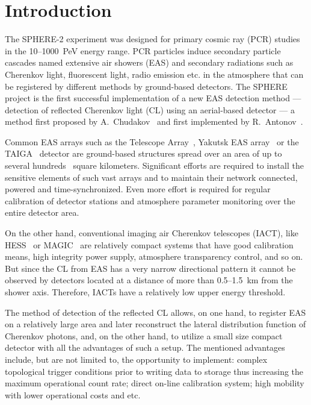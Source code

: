 \documentclass[preprint,5p,times]{elsarticle}
\begin{document}
\section{Introduction}
The SPHERE-2 experiment was designed for primary cosmic ray (PCR) studies in the 10--1000~PeV energy range. PCR particles induce secondary particle cascades named extensive air showers (EAS) and secondary radiations such as Cherenkov light, fluorescent light, radio emission etc. in the atmosphere that can be registered by different methods by ground-based detectors. 
The SPHERE project is the first successful implementation of a new EAS detection method --- detection of reflected Cherenkov light (CL) using an aerial-based detector --- a method first proposed by A.~Chudakov~\cite{chu74:VKKL74} and first implemented by R.~Antonov~\cite{ant75, ant86, ant97, Ant15a}.

Common EAS arrays such as the Telescope Array~\cite{abu12}, Yakutsk EAS array~\cite{Yakutsk19} or the TAIGA~\cite{TAIGA20} detector are ground-based structures spread over an area of up to several hundreds~\cite{abu12} square kilometers. Significant efforts are required to install the sensitive elements of such vast arrays and to maintain their network connected, powered and time-synchronized. Even more effort is required for regular calibration of detector stations and atmosphere parameter monitoring over the entire detector area. 

On the other hand, conventional imaging air Cherenkov telescopes (IACT), like HESS~\cite{HESS03a, HESS03b} or MAGIC~\cite{MAGIC16-1, MAGIC16-2} are relatively compact systems that have good calibration means, high integrity power supply, atmosphere transparency control, and so on. But since the CL from EAS has a very narrow directional pattern it cannot be observed by detectors located at a distance of more than 0.5--1.5~km from the shower axis. Therefore, IACTs have a relatively low upper energy threshold.

The method of detection of the reflected CL allows, on one hand, to register EAS on a relatively large area and later reconstruct the lateral distribution function of Cherenkov photons, and, on the other hand, to utilize a small size compact detector with all the advantages of such a setup. The mentioned advantages include, but are not limited to, the opportunity to implement: complex topological trigger conditions prior to writing data to storage thus increasing the maximum operational count rate; direct on-line calibration system; high mobility with lower operational costs and etc.
\end{document}
